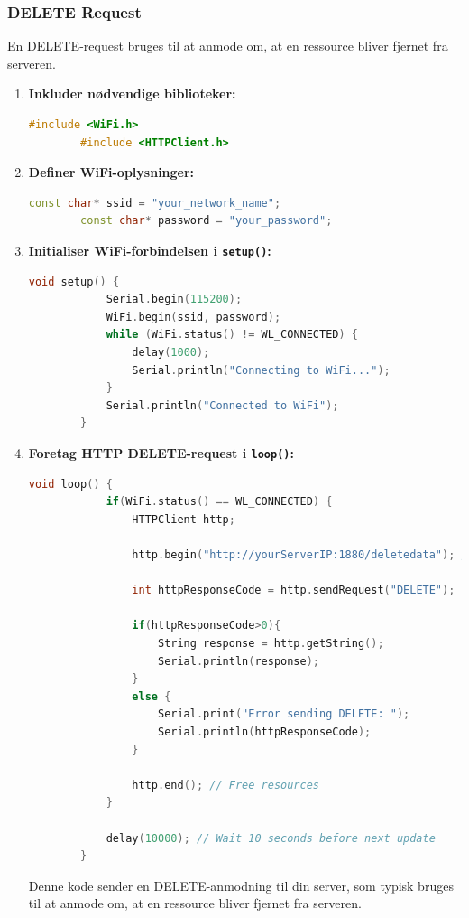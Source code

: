 \subsubsection*{DELETE Request}
En DELETE-request bruges til at anmode om, at en ressource bliver fjernet fra serveren.

\begin{enumerate}
	\item \textbf{Inkluder nødvendige biblioteker:}
	\begin{lstlisting}[language=C++, caption=Include necessary libraries]
		#include <WiFi.h>
		#include <HTTPClient.h>
	\end{lstlisting}
	
	\item \textbf{Definer WiFi-oplysninger:}
	\begin{lstlisting}[language=C++, caption=Define WiFi credentials]
		const char* ssid = "your_network_name";
		const char* password = "your_password";
	\end{lstlisting}
	
	\item \textbf{Initialiser WiFi-forbindelsen i \texttt{setup()}:}
	\begin{lstlisting}[language=C++, caption=Initialize WiFi connection in setup()]
		void setup() {
			Serial.begin(115200);
			WiFi.begin(ssid, password);
			while (WiFi.status() != WL_CONNECTED) {
				delay(1000);
				Serial.println("Connecting to WiFi...");
			}
			Serial.println("Connected to WiFi");
		}
	\end{lstlisting}
	
	\item \textbf{Foretag HTTP DELETE-request i \texttt{loop()}:}
	\begin{lstlisting}[language=C++, caption=Create HTTP connection in loop()]
		void loop() {
			if(WiFi.status() == WL_CONNECTED) {
				HTTPClient http;
				
				http.begin("http://yourServerIP:1880/deletedata"); // Specify the URL
				
				int httpResponseCode = http.sendRequest("DELETE");
				
				if(httpResponseCode>0){
					String response = http.getString();
					Serial.println(response);
				}
				else {
					Serial.print("Error sending DELETE: ");
					Serial.println(httpResponseCode);
				}
				
				http.end(); // Free resources
			}
			
			delay(10000); // Wait 10 seconds before next update
		}
	\end{lstlisting}
	Denne kode sender en DELETE-anmodning til din server, som typisk bruges til at anmode om, at en ressource bliver fjernet fra serveren.
\end{enumerate}

